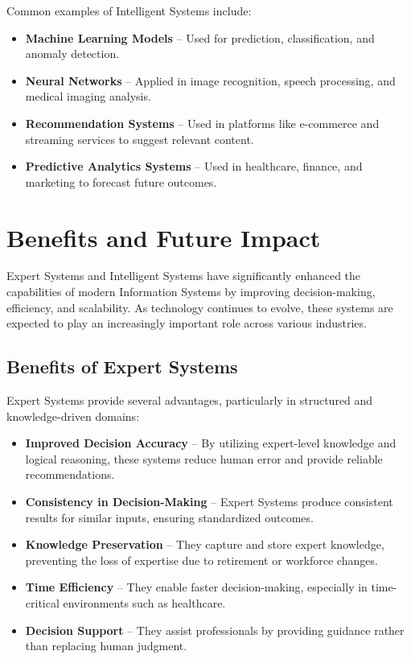 \documentclass[12pt]{article}
\begin{document}
Common examples of Intelligent Systems include:

\begin{itemize}
    \item \textbf{Machine Learning Models} -- Used for prediction, classification, and anomaly detection.
    
    \item \textbf{Neural Networks} -- Applied in image recognition, speech processing, and medical imaging analysis.
    
    \item \textbf{Recommendation Systems} -- Used in platforms like e-commerce and streaming services to suggest relevant content.
    
    \item \textbf{Predictive Analytics Systems} -- Used in healthcare, finance, and marketing to forecast future outcomes.
\end{itemize}

\newpage
\section{Benefits and Future Impact}

Expert Systems and Intelligent Systems have significantly enhanced the capabilities of modern Information Systems by improving decision-making, efficiency, and scalability. As technology continues to evolve, these systems are expected to play an increasingly important role across various industries.

\subsection{Benefits of Expert Systems}

Expert Systems provide several advantages, particularly in structured and knowledge-driven domains:

\begin{itemize}
    \item \textbf{Improved Decision Accuracy} -- By utilizing expert-level knowledge and logical reasoning, these systems reduce human error and provide reliable recommendations.
    
    \item \textbf{Consistency in Decision-Making} -- Expert Systems produce consistent results for similar inputs, ensuring standardized outcomes.
    
    \item \textbf{Knowledge Preservation} -- They capture and store expert knowledge, preventing the loss of expertise due to retirement or workforce changes.
    
    \item \textbf{Time Efficiency} -- They enable faster decision-making, especially in time-critical environments such as healthcare.
    
    \item \textbf{Decision Support} -- They assist professionals by providing guidance rather than replacing human judgment.
\end{itemize}
\end{document}
